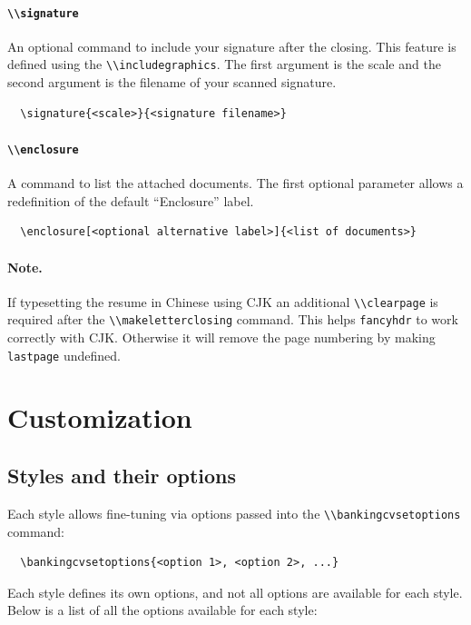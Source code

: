 \documentclass[a4paper, 11pt]{article}
\newcommand{\note}{\paragraph{Note.}}
\newcommand{\code}[1]{\lstinline!#1!}
\begin{document}
\paragraph{\code{\\signature}}
An optional command to include your signature after the closing. This feature is defined using the \code{\\includegraphics}. The first argument is the scale and the second argument is the filename of your scanned signature.
\begin{lstlisting}
  \signature{<scale>}{<signature filename>}
\end{lstlisting}

\paragraph{\code{\\enclosure}}
A command to list the attached documents. The first optional parameter allows a redefinition of the default ``Enclosure'' label.
\begin{lstlisting}
  \enclosure[<optional alternative label>]{<list of documents>}
\end{lstlisting}

\note If typesetting the resume in Chinese using CJK an additional \code{\\clearpage} is required after the \code{\\makeletterclosing} command. This helps \code{fancyhdr} to work correctly with CJK. Otherwise it will remove the page numbering by making \code{lastpage} undefined.

\section{Customization}
\label{section:customization}
\subsection{Styles and their options}
\label{section:customization:stylesAndOptions}
Each style allows fine-tuning via options passed into the \code{\\bankingcvsetoptions} command:
\begin{lstlisting}
  \bankingcvsetoptions{<option 1>, <option 2>, ...}
\end{lstlisting}
Each style defines its own options, and not all options are available for each style.
Below is a list of all the options available for each style:
\end{document}
